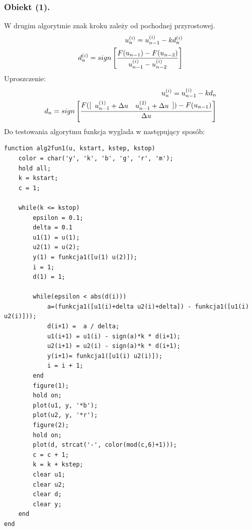 \documentclass[a4paper,10pt]{article}
\begin{document}
\subsubsection{Obiekt (1).}
W drugim algorytmie znak kroku zależy od pochodnej przyrostowej.
\begin{eqnarray}
	u_n^{(i)} = u_{n-1}^{(i)}-kd_n^{(i)}\\
	d_n^{(i)} = sign \left[ {F(u_{n-1}) - F(u_{n-2}) \over u_{n-1}^{(i)} - u_{n-2}^{(i)}} \right] 
\end{eqnarray}
Uproszczenie:
\begin{eqnarray}
	u_n^{(i)} = u_{n-1}^{(i)}-kd_n\\
	d_n = sign \left[ {F([\begin{array}{ll} u_{n-1}^{(1)} + \Delta u & u_{n-1}^{(2)} + \Delta u\end{array}]) - F(u_{n-1}) \over \Delta u}\right] 
\end{eqnarray}
Do testowania algorytmu funkcja wyglada w następujący sposób:
\begin{lstlisting}[caption=Funkcja testująca algorytm 2 dla obiektu 1.]
function alg2fun1(u, kstart, kstep, kstop)
    color = char('y', 'k', 'b', 'g', 'r', 'm');
    hold all;
    k = kstart;
    c = 1;
    
    while(k <= kstop)
        epsilon = 0.1;
        delta = 0.1
        u1(1) = u(1);
        u2(1) = u(2);
        y(1) = funkcja1([u(1) u(2)]);
        i = 1;
        d(1) = 1;
        
        while(epsilon < abs(d(i)))
            a=(funkcja1([u1(i)+delta u2(i)+delta]) - funkcja1([u1(i) u2(i)]));
            d(i+1) =  a / delta;
            u1(i+1) = u1(i) - sign(a)*k * d(i+1);
            u2(i+1) = u2(i) - sign(a)*k * d(i+1);
            y(i+1)= funkcja1([u1(i) u2(i)]);
            i = i + 1;
        end
        figure(1);
        hold on;
        plot(u1, y, '*b');
        plot(u2, y, '*r');
        figure(2);
        hold on;
        plot(d, strcat('-', color(mod(c,6)+1)));
        c = c + 1;
        k = k + kstep;
        clear u1;
        clear u2;
        clear d;
        clear y;
    end
end
\end{lstlisting}
\end{document}
